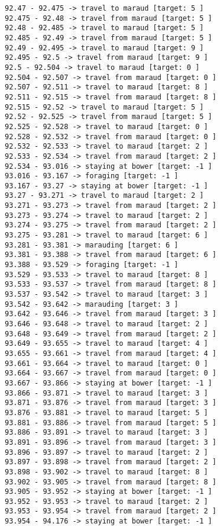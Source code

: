 \documentclass[11pt]{article}
\begin{document}
\begin{Verbatim}[commandchars=\\\{\}]
92.47 - 92.475 -> travel to maraud [target: 5 ]
92.475 - 92.48 -> travel from maraud [target: 5 ]
92.48 - 92.485 -> travel to maraud [target: 5 ]
92.485 - 92.49 -> travel from maraud [target: 5 ]
92.49 - 92.495 -> travel to maraud [target: 9 ]
92.495 - 92.5 -> travel from maraud [target: 9 ]
92.5 - 92.504 -> travel to maraud [target: 0 ]
92.504 - 92.507 -> travel from maraud [target: 0 ]
92.507 - 92.511 -> travel to maraud [target: 8 ]
92.511 - 92.515 -> travel from maraud [target: 8 ]
92.515 - 92.52 -> travel to maraud [target: 5 ]
92.52 - 92.525 -> travel from maraud [target: 5 ]
92.525 - 92.528 -> travel to maraud [target: 0 ]
92.528 - 92.532 -> travel from maraud [target: 0 ]
92.532 - 92.533 -> travel to maraud [target: 2 ]
92.533 - 92.534 -> travel from maraud [target: 2 ]
92.534 - 93.016 -> staying at bower [target: -1 ]
93.016 - 93.167 -> foraging [target: -1 ]
93.167 - 93.27 -> staying at bower [target: -1 ]
93.27 - 93.271 -> travel to maraud [target: 2 ]
93.271 - 93.273 -> travel from maraud [target: 2 ]
93.273 - 93.274 -> travel to maraud [target: 2 ]
93.274 - 93.275 -> travel from maraud [target: 2 ]
93.275 - 93.281 -> travel to maraud [target: 6 ]
93.281 - 93.381 -> marauding [target: 6 ]
93.381 - 93.388 -> travel from maraud [target: 6 ]
93.388 - 93.529 -> foraging [target: -1 ]
93.529 - 93.533 -> travel to maraud [target: 8 ]
93.533 - 93.537 -> travel from maraud [target: 8 ]
93.537 - 93.542 -> travel to maraud [target: 3 ]
93.542 - 93.642 -> marauding [target: 3 ]
93.642 - 93.646 -> travel from maraud [target: 3 ]
93.646 - 93.648 -> travel to maraud [target: 2 ]
93.648 - 93.649 -> travel from maraud [target: 2 ]
93.649 - 93.655 -> travel to maraud [target: 4 ]
93.655 - 93.661 -> travel from maraud [target: 4 ]
93.661 - 93.664 -> travel to maraud [target: 0 ]
93.664 - 93.667 -> travel from maraud [target: 0 ]
93.667 - 93.866 -> staying at bower [target: -1 ]
93.866 - 93.871 -> travel to maraud [target: 3 ]
93.871 - 93.876 -> travel from maraud [target: 3 ]
93.876 - 93.881 -> travel to maraud [target: 5 ]
93.881 - 93.886 -> travel from maraud [target: 5 ]
93.886 - 93.891 -> travel to maraud [target: 3 ]
93.891 - 93.896 -> travel from maraud [target: 3 ]
93.896 - 93.897 -> travel to maraud [target: 2 ]
93.897 - 93.898 -> travel from maraud [target: 2 ]
93.898 - 93.902 -> travel to maraud [target: 8 ]
93.902 - 93.905 -> travel from maraud [target: 8 ]
93.905 - 93.952 -> staying at bower [target: -1 ]
93.952 - 93.953 -> travel to maraud [target: 2 ]
93.953 - 93.954 -> travel from maraud [target: 2 ]
93.954 - 94.176 -> staying at bower [target: -1 ]

\end{Verbatim}
\end{document}
